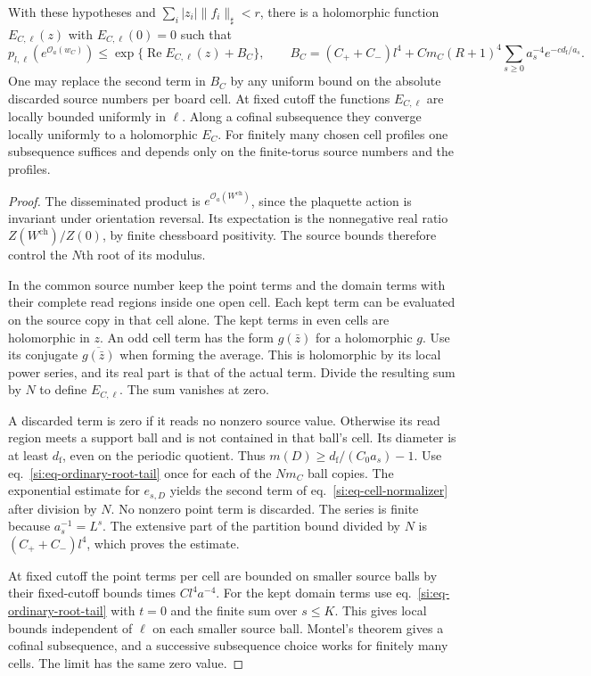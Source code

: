\documentclass[11pt,letterpaper,reqno]{amsart}
\makeatletter
\numberwithin{equation}{section}
\renewcommand{\eqref}[1]{\textup{eq.~\ref{#1}}}
\theoremstyle{definition}
\newcommand{\ms@minorstart}{%
  \pushQED{\qed}\renewcommand{\qedsymbol}{$\blacksquare$}}
\newenvironment{lemma}[1][]{\ms@minorstart\ms@lemma[#1]}
  {\popQED\endms@lemma}
\theoremstyle{remark}
\makeatother
\begin{document}
\begin{samepage}
\begin{lemma}[A holomorphic cell normalization]
\label{si:lem-cell-normalizer}
With these hypotheses and $\sum_i|z_i|\|f_i\|_\sharp<r$, there
is a holomorphic function $E_{C,\ell}(z)$ with $E_{C,\ell}(0)=0$
such that
\begin{equation}\label{si:eq-cell-normalizer}
 p_{l,\ell}(e^{\mathcal O_a(w_C)})
     \le \exp\{\operatorname{Re}E_{C,\ell}(z)+B_C\},
 \qquad
 B_C=(C_++C_-)l^4+C m_C(R+1)^4
       \sum_{s\ge0}a_s^{-4}e^{-c d_{\mathrm f}/a_s}.
\end{equation}
One may replace the second term in $B_C$ by any uniform bound
on the absolute discarded source numbers per board cell.
At fixed cutoff the functions $E_{C,\ell}$ are locally bounded
uniformly in $\ell$. Along a cofinal subsequence they converge
locally uniformly to a holomorphic $E_C$. For finitely many chosen
cell profiles one subsequence suffices and depends only on the
finite-torus source numbers and the profiles.
\end{lemma}
\end{samepage}
\begin{proof}
The disseminated product is $e^{\mathcal O_a(W^{\mathrm{ch}})}$,
since the plaquette action is invariant under orientation reversal.
Its expectation is the nonnegative real ratio
$Z(W^{\mathrm{ch}})/Z(0)$, by finite chessboard positivity.
The source bounds therefore control the $N$th root of its modulus.

In the common source number keep the point terms and the domain
terms with their complete read regions inside one open cell.
Each kept term can be evaluated on the source copy in that cell
alone. The kept terms in even cells are holomorphic in $z$.
An odd cell term has the form $g(\bar z)$ for a holomorphic
$g$. Use its conjugate $\overline{g(\bar z)}$ when forming the
average. This is holomorphic by its local power series, and its
real part is that of the actual term. Divide the resulting sum by
$N$ to define $E_{C,\ell}$. The sum vanishes at zero.

A discarded term is zero if it reads no nonzero source value.
Otherwise its read region meets a support ball and is not contained
in that ball's cell. Its diameter is at least $d_{\mathrm f}$,
even on the periodic quotient. Thus $m(D)\ge d_{\mathrm f}/(C_0a_s)-1$.
Use \eqref{si:eq-ordinary-root-tail} once for each of the $N m_C$
ball copies. The exponential estimate for $e_{s,D}$ yields the
second term of \eqref{si:eq-cell-normalizer} after division by
$N$. No nonzero point term is discarded. The series is finite
because $a_s^{-1}=L^s$. The extensive part of the partition bound
divided by $N$ is $(C_++C_-)l^4$, which proves the estimate.

At fixed cutoff the point terms per cell are bounded on smaller
source balls by their fixed-cutoff bounds times $C l^4a^{-4}$.
For the kept domain terms use \eqref{si:eq-ordinary-root-tail} with
$t=0$ and the finite sum over $s\le K$. This gives local bounds
independent of $\ell$ on each smaller source ball. Montel's theorem
gives a cofinal subsequence, and a successive subsequence choice
works for finitely many cells. The limit has the same zero value.
\end{proof}
\end{document}
